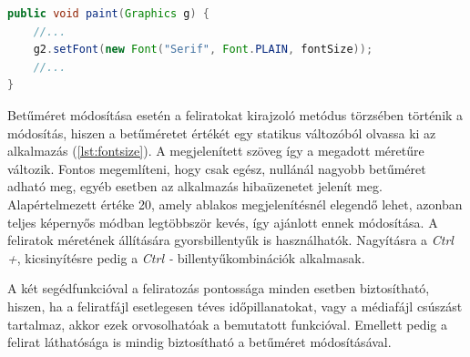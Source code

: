 \begin{lstlisting}[caption=Feliratok mérete, label={lst:fontsize}, language=java]
public void paint(Graphics g) {
	//...
	g2.setFont(new Font("Serif", Font.PLAIN, fontSize));
	//...
}
\end{lstlisting}

Betűméret módosítása esetén a feliratokat kirajzoló metódus törzsében történik a módosítás, hiszen a betűméretet értékét egy statikus változóból olvassa ki az alkalmazás (\ref{lst:fontsize}). A megjelenített szöveg így a megadott méretűre változik. Fontos megemlíteni, hogy csak egész, nullánál nagyobb betűméret adható meg, egyéb esetben az alkalmazás hibaüzenetet jelenít meg. Alapértelmezett értéke 20, amely ablakos megjelenítésnél elegendő lehet, azonban teljes képernyős módban legtöbbször kevés, így ajánlott ennek módosítása. A feliratok méretének állítására gyorsbillentyűk is használhatók. Nagyításra a \textit{Ctrl +}, kicsinyítésre pedig a \textit{Ctrl -} billentyűkombinációk alkalmasak.

A két segédfunkcióval a feliratozás pontossága minden esetben biztosítható, hiszen, ha a feliratfájl esetlegesen téves időpillanatokat, vagy a médiafájl csúszást tartalmaz, akkor ezek orvosolhatóak a bemutatott funkcióval. Emellett pedig a felirat láthatósága is mindig biztosítható a betűméret módosításával.